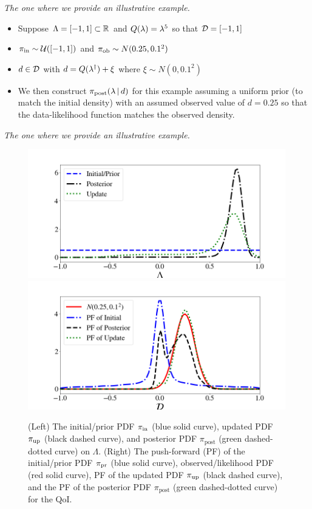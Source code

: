 \begin{frame}[t]{\it The one where we provide an illustrative example.}

\begin{itemize}
\item Suppose ${\Lambda} = [-1,1]\subset\mathbb{R}$ and $Q(\lambda)=\lambda^5$ so that $\mathcal{D} = [-1,1]$
\item $\operatorname*{\pi_{in}}\sim \mathcal{U}([-1,1])$ and $\operatorname*{\pi_{ob}}\sim N(0.25,0.1^2)$
\item $d\in \mathcal{D}$ with $d=Q(\lambda^\dagger)+\xi$ where $\xi\sim N(0,0.1^2)$
\item We then construct $\pi_{\text{post}}(\lambda \, |\, d)$ for this example assuming a uniform prior (to match the initial density) with an assumed observed value of $d=0.25$ so that the data-likelihood function matches the observed density.
\end{itemize}

\end{frame}


\begin{frame}[t]{\it The one where we provide an illustrative example.}

\begin{figure}
\centering
   \includegraphics[width=0.49\linewidth]{figures/bip-vs-sip-1.png}
   \includegraphics[width=0.49\linewidth]{figures/bip-vs-sip-pf-1.png}
 \caption{(Left) The initial/prior PDF $\operatorname*{\pi_{in}}$ (blue solid curve), updated PDF $\operatorname*{\pi_{up}}$ (black dashed curve), and posterior PDF $\pi_\text{post}$ (green dashed-dotted curve) on $\Lambda$.
 (Right) The push-forward (PF) of the initial/prior PDF $\operatorname*{\pi_{pr}}$ (blue solid curve), observed/likelihood PDF (red solid curve), PF of the updated PDF $\operatorname*{\pi_{up}}$ (black dashed curve), and the PF of the posterior PDF $\pi_\text{post}$ (green dashed-dotted curve) for the QoI.}
 \label{fig:bayes-comparison}
\end{figure}

\end{frame}

